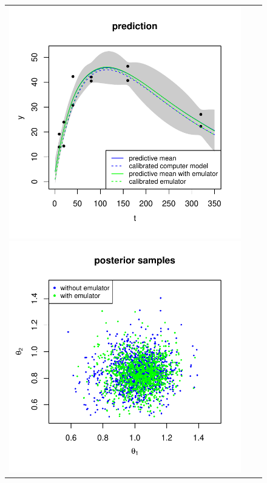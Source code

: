   \begin{figure}[t]
\centering
  \begin{tabular}{ccc}

	\hspace{-.2in} \includegraphics[scale=.63]{figures/Box_sgasp.pdf}
	\hspace{-.3in} \includegraphics[scale=.63]{figures/Box_post_samples.pdf}

\end{tabular}
\end{figure}
